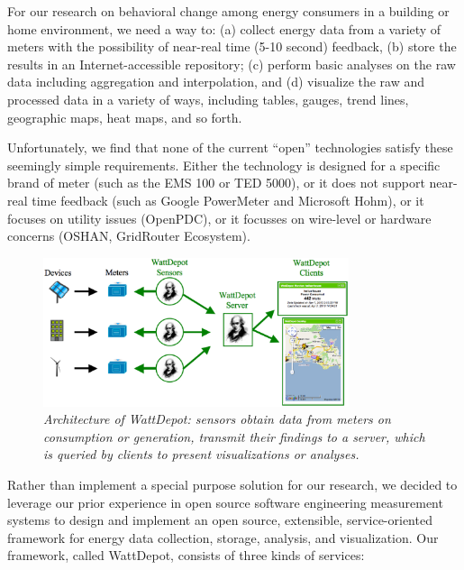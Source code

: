 \documentclass[conference]{IEEEtran}
\begin{document}
For our research on behavioral change among energy consumers in a building
or home environment, we need a way to: (a) collect energy data from a
variety of meters with the possibility of near-real time (5-10 second)
feedback, (b) store the results in an Internet-accessible repository; (c)
perform basic analyses on the raw data including aggregation and
interpolation, and (d) visualize the raw and processed data in a variety of
ways, including tables, gauges, trend lines, geographic maps, heat maps, and so forth.

Unfortunately, we find that none of the current ``open'' technologies
satisfy these seemingly simple requirements. Either the technology is
designed for a specific brand of meter (such as the EMS 100 or TED 5000), or it does not
support near-real time feedback (such as Google PowerMeter and Microsoft
Hohm), or it focuses on utility issues (OpenPDC), or it focusses on
wire-level or hardware concerns (OSHAN, GridRouter Ecosystem).


\begin{figure}[!th]
  \center
  \includegraphics[width=0.8\textwidth]{architecture.eps}
  \caption{\em \small Architecture of WattDepot: sensors obtain data from
    meters on consumption or generation, transmit their findings to a
    server, which is queried by clients to present visualizations or analyses.}
  \label{fig:architecture}
\end{figure} 

Rather than implement a special purpose solution for our research, we
decided to leverage our prior experience in open source software
engineering measurement systems to design and implement an open source,
extensible, service-oriented framework for energy data collection, storage,
analysis, and visualization. Our framework, called WattDepot, consists of
three kinds of services:
\end{document}
